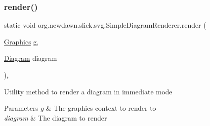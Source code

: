 \subsubsection{\texorpdfstring{render()}{render()}\hspace{0.1cm}{\footnotesize\ttfamily [2/2]}}
{\footnotesize\ttfamily static void org.\+newdawn.\+slick.\+svg.\+Simple\+Diagram\+Renderer.\+render (\begin{DoxyParamCaption}\item[{\mbox{\hyperlink{classorg_1_1newdawn_1_1slick_1_1_graphics}{Graphics}}}]{g,  }\item[{\mbox{\hyperlink{classorg_1_1newdawn_1_1slick_1_1svg_1_1_diagram}{Diagram}}}]{diagram }\end{DoxyParamCaption})\hspace{0.3cm}{\ttfamily [inline]}, {\ttfamily [static]}}

Utility method to render a diagram in immediate mode


\begin{DoxyParams}{Parameters}
{\em g} & The graphics context to render to \\
\hline
{\em diagram} & The diagram to render \\
\hline
\end{DoxyParams}

